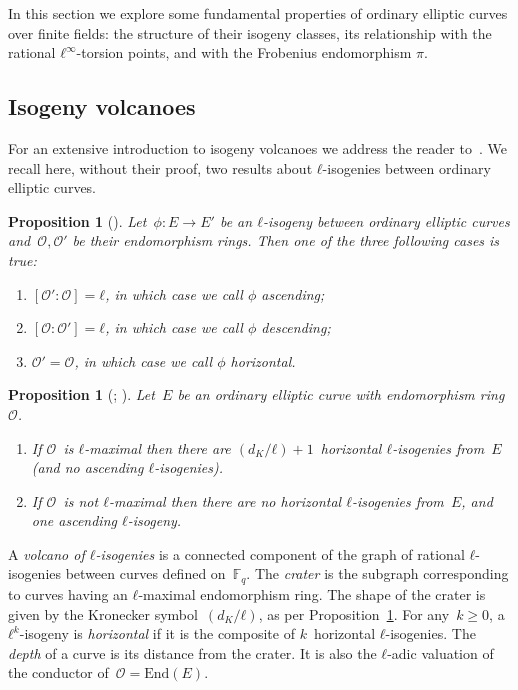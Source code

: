 \documentclass{lms}
\newtheorem{prop}[thm]{Proposition}
\begin{document}
In this section we explore some fundamental properties of ordinary
elliptic curves over finite fields: the structure of their isogeny
classes, its relationship with the rational $ℓ^∞$-torsion points, and
with the Frobenius endomorphism $π$.

\subsection{Isogeny volcanoes}

For an extensive introduction to isogeny volcanoes we address the
reader to~\cite{sutherland2013isogeny}.  We recall here, without their
proof, two results about $ℓ$-isogenies between ordinary elliptic
curves.

\begin{prop}[{\cite[Proposition~21]{Kohel}}] \label{prop:isogeny-asc-desc}
Let~$ϕ: E → E'$ be an $ℓ$-isogeny between ordinary elliptic curves
and~$\mathcal O, \mathcal O'$ be their endomorphism rings.
Then one of the three following cases is true:
\begin{enumerate}
\item $[\mathcal O':\mathcal O] = ℓ$,
in which case we call $ϕ$ \emph{ascending};
\item $[\mathcal O:\mathcal O'] = ℓ$,
in which case we call $ϕ$ \emph{descending};
\item $\mathcal O' = \mathcal O$,
in which case we call $ϕ$ \emph{horizontal}.
\end{enumerate}
\end{prop}
\begin{prop}[{\cite[Proposition~23]{Kohel}; \cite[Lemma~6]{sutherland2013isogeny}}] \label{prop:isogeny-count}
Let~$E$ be an ordinary elliptic curve with endomorphism ring~$\mathcal O$.
\begin{enumerate}
\item If $\mathcal O$~is $ℓ$-maximal then
there are $(d_K/ℓ)+1$~horizontal $ℓ$-isogenies from~$E$
(and no ascending $ℓ$-isogenies).
\item If $\mathcal O$~is not $ℓ$-maximal then
there are no horizontal $ℓ$-isogenies from~$E$,
and one ascending $ℓ$-isogeny.
\end{enumerate}
\end{prop}

A \emph{volcano of $ℓ$-isogenies} is a connected component
of the graph of rational $ℓ$-isogenies between curves defined on~$\mathbb F_q$.
The \emph{crater} is the subgraph corresponding to curves
having an $ℓ$-maximal endomorphism ring.
The shape of the crater is given by the Kronecker symbol~$(d_K/ℓ)$,
as per Proposition~\ref{prop:isogeny-count}.
For any~$k ≥ 0$, a $ℓ^k$-isogeny is \emph{horizontal}
if it is the composite of $k$~horizontal $ℓ$-isogenies.
The \emph{depth} of a curve is its distance from the crater.
It is also the $ℓ$-adic valuation of the conductor
of~$\mathcal O = \mathrm{End}(E)$.
\end{document}

